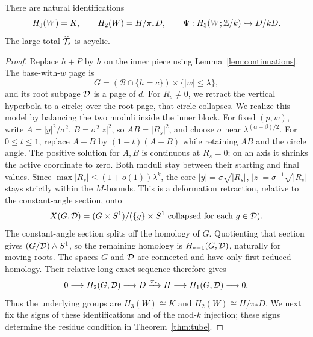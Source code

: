 \begin{lemma}\label{lem:acyclic}
There are natural identifications
\begin{equation}
H_3(W)=K,\qquad H_2(W)=H/\pi_*D,\qquad
\Psi:H_3(W;\mathbb Z/k)\hookrightarrow D/kD.
\label{eq:tube-11}
\end{equation}
The large total \(\widehat{\mathcal T}_s\) is acyclic.
\end{lemma}
\begin{proof}
Replace \(h+P\) by \(h\) on the inner piece using
Lemma~\ref{lem:continuations}. The base-with-\(w\) page is
\[
G=(\mathcal B\cap\{h=c\})\times\{|w|\le\lambda\},
\]
and its root subpage \(\mathcal D\) is a page of \(d\). For \(R_s\ne0\),
we retract the vertical hyperbola to a circle; over the root page,
that circle collapses. We realize this model by balancing the two
moduli inside the inner block. For fixed \((p,w)\), write \(A=|y|^2/\sigma^2\),
\(B=\sigma^2|z|^2\), so \(AB=|R_s|^2\), and choose
\(\sigma\) near \(\lambda^{(\alpha-\beta)/2}\).
For \(0\le t\le1\), replace \(A-B\) by
\((1-t)(A-B)\) while retaining \(AB\) and the circle angle.
The positive solution for \(A,B\) is continuous at \(R_s=0\);
on an axis it shrinks the active coordinate to zero.
Both moduli stay between their starting and final values.
Since \(\max|R_s|\le(1+o(1))\lambda^k\), the core
\(|y|=\sigma\sqrt{|R_s|}\),
\(|z|=\sigma^{-1}\sqrt{|R_s|}\) stays strictly within the
\(M\)-bounds. This is a deformation retraction, relative to
the constant-angle section, onto
\begin{equation}
X(G,\mathcal D)=(G\times S^1)/
(\{g\}\times S^1\text{ collapsed for each }g\in\mathcal D).
\label{eq:tube-12}
\end{equation}
The constant-angle section splits off the homology of \(G\).
Quotienting that section gives \((G/\mathcal D)\wedge S^1\), so the
remaining homology is \(H_{*-1}(G,\mathcal D)\), naturally for moving roots.
The spaces \(G\) and \(\mathcal D\) are connected and have only first
reduced homology. Their relative long exact sequence therefore gives
\[
0\longrightarrow H_2(G,\mathcal D)\longrightarrow D
\xrightarrow{\pi_*}H\longrightarrow H_1(G,\mathcal D)\longrightarrow0.
\]
Thus the underlying groups are \(H_3(W)\cong K\) and
\(H_2(W)\cong H/\pi_*D\). We next fix the signs of these
identifications and of the mod-\(k\) injection; these signs determine
the residue condition in Theorem~\ref{thm:tube}.


\end{proof}

